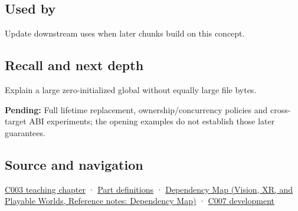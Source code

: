 \subsection{Used by}\label{appendix-17c93c4c2f19-used-by}

\hypertarget{appendix-17c93c4c2f19-used-by}{}

Update downstream uses when later chunks build on this concept.

\subsection{Recall and next depth}\label{appendix-17c93c4c2f19-recall-and-next-depth}

\hypertarget{appendix-17c93c4c2f19-recall-and-next-depth}{}

Explain a large zero-initialized global without equally large file bytes.

\textbf{Pending:} Full lifetime replacement, ownership/concurrency policies and cross-target ABI experiments; the opening examples do not establish those later guarantees.

\subsection{Source and navigation}\label{appendix-17c93c4c2f19-source-and-navigation}

\hypertarget{appendix-17c93c4c2f19-source-and-navigation}{}

\hyperref[01-foundations-i-ch002-where-the-bytes-live]{C003 teaching chapter} · \hyperref[appendix-fd090d982a15-m003---parts-41-60]{Part definitions} · \href{../07-Vision-XR-and-Playable-Worlds/main.pdf\#nameddest=appendix-4ad47bdd269a}{Dependency Map (Vision, XR, and Playable Worlds, Reference notes: Dependency Map)} · \hyperref[01-foundations-i-ch002-a-name-does-not-decide-how-long-storage-lasts]{C007 development}
